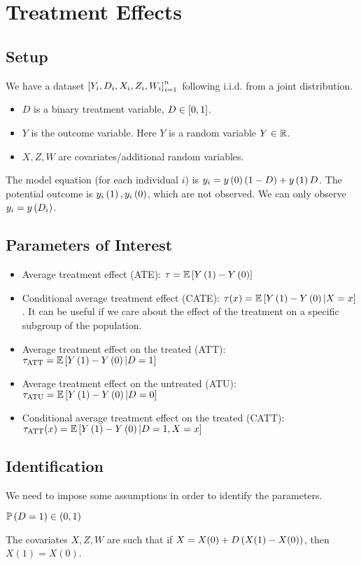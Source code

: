 \section{Treatment Effects}
\subsection{Setup} We have a dataset $\left[Y_i,D_i,X_i,Z_i,W_i\right]_{i=1}^n$ following i.i.d. from a
joint distribution.
\begin{itemize}
    \item $D$ is a binary treatment variable, $D\in\left[0,1\right]$.
    \item $Y$ is the outcome variable. Here $Y$ is a random variable $Y\in \mathbb{R}$.
    \item $X,Z,W$ are covariates/additional random variables.
\end{itemize}
The model equation (for each individual $i$) is $y_i=y\left(0\right)(1-D)+y\left(1\right)D$. The potential outcome is $y_i\left(1\right),y_i\left(0\right)$, which are not observed. We can only observe $y_i=y\left(D_i\right)$.

\subsection{Parameters of Interest}
\begin{itemize}
    \item Average treatment effect (ATE): $\tau = \mathbb{E}\left[Y\left(1\right)-Y\left(0\right)\right]$
    \item Conditional average treatment effect (CATE): $\tau(x) =
              \mathbb{E}\left[Y\left(1\right)-Y\left(0\right)|X=x\right]$. It can be useful if we care about the effect of
          the treatment on a specific subgroup of the population.
    \item Average treatment effect on the treated (ATT): $\tau_{\text{ATT}} =
              \mathbb{E}\left[Y\left(1\right)-Y\left(0\right)|D=1\right]$
    \item Average treatment effect on the untreated (ATU): $\tau_{\text{ATU}} =
              \mathbb{E}\left[Y\left(1\right)-Y\left(0\right)|D=0\right]$
    \item Conditional average treatment effect on the treated (CATT):
          $\tau_{\text{ATT}}(x) = \mathbb{E}\left[Y\left(1\right)-Y\left(0\right)|D=1,X=x\right]$
\end{itemize}

\subsection{Identification}
We need to impose some assumptions in order to identify the parameters.
\begin{assumption}
    $\mathbb{P}\left(D=1\right)\in \left(0,1\right)$
\end{assumption}
\begin{assumption}
    The covariates $X,Z,W$ are such that if $X=X(0)+D\left(X(1)-X(0)\right)$, then $X(1)=X(0)$.
\end{assumption}

